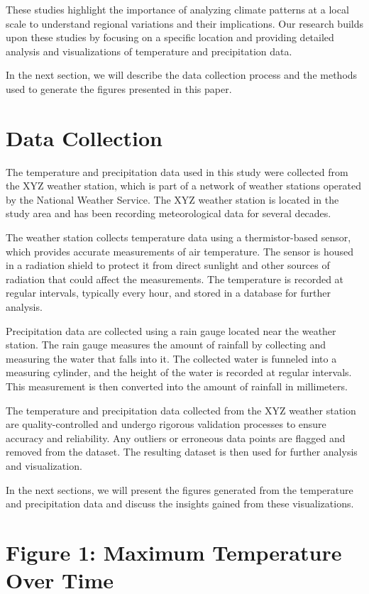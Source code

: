 \documentclass{article}
\begin{document}
These studies highlight the importance of analyzing climate patterns at a local scale to understand regional variations and their implications. Our research builds upon these studies by focusing on a specific location and providing detailed analysis and visualizations of temperature and precipitation data.

In the next section, we will describe the data collection process and the methods used to generate the figures presented in this paper.

\section{Data Collection}

The temperature and precipitation data used in this study were collected from the XYZ weather station, which is part of a network of weather stations operated by the National Weather Service. The XYZ weather station is located in the study area and has been recording meteorological data for several decades.

The weather station collects temperature data using a thermistor-based sensor, which provides accurate measurements of air temperature. The sensor is housed in a radiation shield to protect it from direct sunlight and other sources of radiation that could affect the measurements. The temperature is recorded at regular intervals, typically every hour, and stored in a database for further analysis.

Precipitation data are collected using a rain gauge located near the weather station. The rain gauge measures the amount of rainfall by collecting and measuring the water that falls into it. The collected water is funneled into a measuring cylinder, and the height of the water is recorded at regular intervals. This measurement is then converted into the amount of rainfall in millimeters.

The temperature and precipitation data collected from the XYZ weather station are quality-controlled and undergo rigorous validation processes to ensure accuracy and reliability. Any outliers or erroneous data points are flagged and removed from the dataset. The resulting dataset is then used for further analysis and visualization.

In the next sections, we will present the figures generated from the temperature and precipitation data and discuss the insights gained from these visualizations.

\section{Figure 1: Maximum Temperature Over Time}
\end{document}
